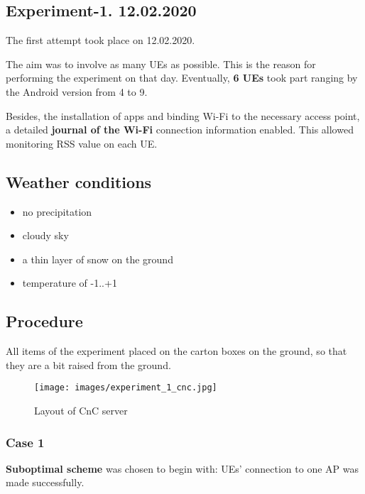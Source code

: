 \hypertarget{experiment-1.-12.02.2020}{%
\subsection{Experiment-1. 12.02.2020}\label{experiment-1.-12.02.2020}}

The first attempt took place on 12.02.2020.

The aim was to involve as many UEs as possible. This is the reason for performing the experiment on that day. Eventually, \textbf{6 UEs} took part ranging by the Android version from 4 to 9.

Besides, the installation of apps and binding Wi-Fi to the necessary
access point, a detailed \textbf{journal of the Wi-Fi} connection
information enabled. This allowed monitoring RSS value on each UE.

\hypertarget{weather-conditions}{%
\subsection{Weather conditions}\label{weather-conditions}}

\begin{itemize}
\tightlist
\item
  no precipitation
\item
  cloudy sky
\item
  a thin layer of snow on the ground
\item
  temperature of -1..+1
\end{itemize}

\hypertarget{procedure}{%
\subsection{Procedure}\label{procedure}}

All items of the experiment placed on the carton boxes on the ground, so that they are a bit raised from the ground.

\begin{figure}[H]
	\centering
	\texttt{[image: images/experiment\_1\_cnc.jpg]}
\caption{Layout of CnC server}
\end{figure}

\hypertarget{case-1}{%
\subsubsection{Case 1}\label{case-1}}

\textbf{Suboptimal scheme} was chosen to begin with: UEs' connection to one AP was made successfully.

